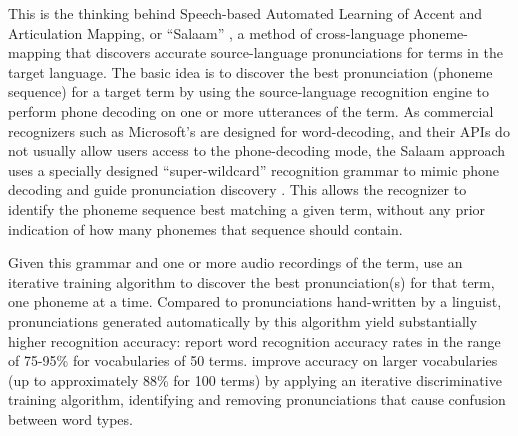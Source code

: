 \documentclass[11pt]{article}
\begin{document}
This is the thinking behind Speech-based Automated Learning of Accent and Articulation Mapping, or ``Salaam'' \cite{Sherwani09,Qiao10,Chan12}, a
method of cross-language phoneme-mapping 
that
discovers accurate source-language pronunciations for terms in the 
target language. 
The basic idea 
is to discover the best pronunciation (phoneme sequence) for a target term by using the source-language recognition engine to perform phone decoding on one or more utterances of the term. As commercial recognizers such as Microsoft's are designed for word-decoding, and their APIs do not usually allow users access to the phone-decoding mode, the Salaam approach uses a specially designed  ``super-wildcard'' recognition grammar 
to mimic phone decoding 
and guide pronunciation discovery \cite{Qiao10,Chan12}.
This allows the recognizer to identify the phoneme sequence best matching a given term, without any prior indication of how many phonemes that sequence should contain.

Given this grammar and one or more audio recordings of the %
term,  use an iterative training algorithm to discover the best pronunciation(s) for that term, one phoneme at a time. 
%
Compared to pronunciations hand-written by a linguist, pronunciations generated automatically by this algorithm yield substantially higher recognition accuracy: %
 report word recognition accuracy rates in the range of 75-95\% for vocabularies of 50 terms.
 improve accuracy on larger vocabularies (up to approximately 88\% for 100 terms) by applying an iterative discriminative training algorithm, identifying and removing pronunciations that cause confusion between word types.
\end{document}
